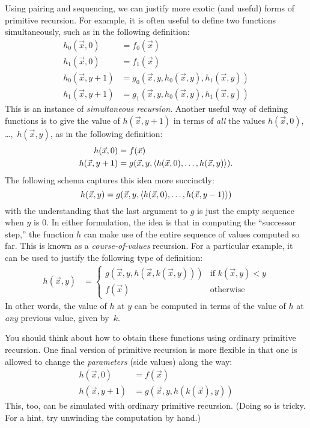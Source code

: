 \documentclass[../../../include/open-logic-section]{subfiles}
\begin{document}

Using pairing and sequencing, we can justify more exotic (and
useful) forms of primitive recursion. For example, it is often useful
to define two functions simultaneously, such as in the following
definition:
\begin{align*}
h_0(\vec x, 0) & = f_0(\vec x) \\
h_1(\vec x, 0) & = f_1(\vec x) \\
h_0(\vec x, y+1) & = g_0(\vec x, y, h_0(\vec x, y), h_1(\vec x, y)) \\
h_1(\vec x, y+1) & = g_1(\vec x, y, h_0(\vec x, y), h_1(\vec x, y))
\end{align*}
This is an instance of \emph{simultaneous recursion}. Another useful
way of defining functions is to give the value of $h(\vec x, y+1)$ in
terms of \emph{all} the values $h(\vec x, 0)$, \dots,~$h(\vec x, y)$, as in
the following definition:
\begin{align*}
h(\vec x, 0) & = f(\vec x) \\
h(\vec x, y+1) & = g(\vec x, y, \tuple{h(\vec x, 0), \dots, h(\vec x, y)}).
\end{align*}
The following schema captures this idea more succinctly:
\[
h(\vec x, y) = g(\vec x, y, \langle h(\vec x, 0), \dots, h(\vec x, y-1) \rangle)
\]
with the understanding that the last argument to $g$ is just the
empty sequence when $y$ is $0$. In either formulation, the idea is
that in computing the ``successor step,'' the function $h$ can make
use of the entire sequence of values computed so far.
This is known as a \emph{course-of-values} recursion. For a particular
example, it can be used to justify the following type of definition:
\begin{align*}
h(\vec x, y) & = \begin{cases}
  g(\vec x, y, h(\vec x, k(\vec x, y))) & \text{if $k(\vec x, y) < y$} \\
  f(\vec x) & \text{otherwise}
\end{cases}
\end{align*}
In other words, the value of $h$ at $y$ can be computed in terms of
the value of $h$ at \emph{any} previous value, given by~$k$.

You should think about how to obtain these functions using ordinary
primitive recursion. One final version of primitive recursion is more
flexible in that one is allowed to change the \emph{parameters} (side
values) along the way:
\begin{align*}
h(\vec x, 0) & = f(\vec x) \\
h(\vec x, y+1) & = g(\vec x, y, h(k(\vec x), y))
\end{align*}
This, too, can be simulated with ordinary primitive recursion. (Doing
so is tricky. For a hint, try unwinding the computation by hand.)
\end{document}

